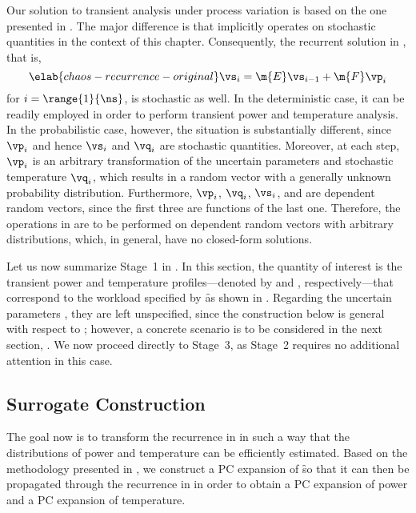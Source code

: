 Our solution to transient analysis under process variation is based on the one
presented in . The major difference is that
 implicitly operates on stochastic quantities in the
context of this chapter. Consequently, the recurrent solution in
, that is,
\begin{equation} \elab{chaos-recurrence-original}
  \vs_i = \m{E} \vs_{i - 1} + \m{F} \vp_i
\end{equation}
for $i = \range{1}{\ns}$, is stochastic as well. In the deterministic case, it
can be readily employed in order to perform transient power and temperature
analysis. In the probabilistic case, however, the situation is substantially
different, since $\vp_i$ and hence $\vs_i$ and $\vq_i$ are stochastic
quantities. Moreover, at each step, $\vp_i$ is an arbitrary transformation of
the uncertain parameters \vu and stochastic temperature $\vq_i$, which results
in a random vector with a generally unknown probability distribution.
Furthermore, $\vp_i$, $\vq_i$, $\vs_i$, and \vu are dependent random vectors,
since the first three are functions of the last one. Therefore, the operations
in  are to be performed on dependent random
vectors with arbitrary distributions, which, in general, have no closed-form
solutions.

Let us now summarize Stage~1 in . In this section, the
quantity of interest \g is the transient power and temperature
profiles---denoted by \mp and \mq, respectively---that correspond to the
workload specified by \f as shown in . Regarding the
uncertain parameters \vu, they are left unspecified, since the construction
below is general with respect to \vu; however, a concrete scenario is to be
considered in the next section, . We now
proceed directly to Stage~3, as Stage~2 requires no additional attention in this
case.

\subsection{Surrogate Construction}

The goal now is to transform the recurrence in 
in such a way that the distributions of power and temperature can be efficiently
estimated. Based on the methodology presented in
, we construct a \ac{PC} expansion of \f so
that it can then be propagated through the recurrence in
 in order to obtain a \ac{PC} expansion of power
and a \ac{PC} expansion of temperature.

